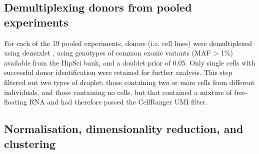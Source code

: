 
\newpage

\subsection{Demultiplexing donors from pooled experiments}

For each of the 19 pooled experiments, donors (i.e. cell lines) were demultiplexed using demuxlet \cite{kang2018multiplexed}, using genotypes of common exonic variants (MAF > 1\%) available from the HipSci bank, and a doublet prior of 0.05. 
Only single cells with successful donor identification were retained for further analysis. 
This step filtered out two types of droplet: those containing two or more cells from different individuals, and those containing no cells, but that contained a mixture of free-floating RNA and had therefore passed the CellRanger UMI filter.

\subsection{Normalisation, dimensionality reduction, and clustering}


